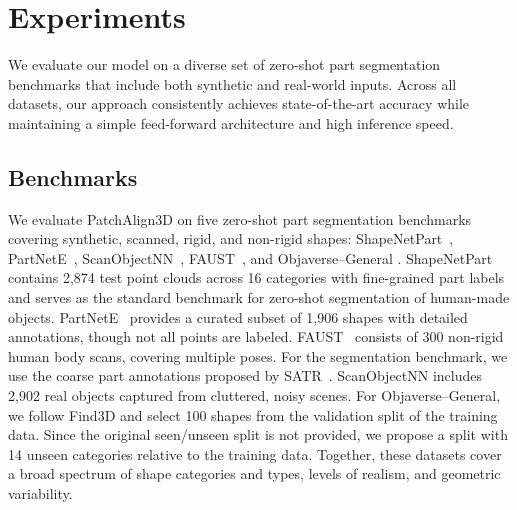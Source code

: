 \section{Experiments}
\label{sec:experiments}

We evaluate our model on a diverse set of zero-shot part segmentation benchmarks that include both synthetic and real-world inputs.  
Across all datasets, our approach consistently achieves state-of-the-art accuracy while maintaining a simple feed-forward architecture and high inference speed.

\subsection{Benchmarks}

We evaluate PatchAlign3D on five zero-shot part segmentation benchmarks covering synthetic, scanned, rigid, and non-rigid shapes: ShapeNetPart~\cite{yi2016scalable}, PartNetE~\cite{liu2023partslip}, ScanObjectNN~\cite{uy2019revisiting}, FAUST~\cite{bogo2014faust}, and Objaverse–General \cite{ma2025find, deitke2023objaverse}. 
ShapeNetPart~\cite{yi2016scalable} contains 2,874 test point clouds across 16 categories with fine-grained part labels and serves as the standard benchmark for zero-shot segmentation of human-made objects. 
PartNetE~\cite{liu2023partslip} provides a curated subset of 1,906 shapes with detailed annotations, though not all points are labeled. 
FAUST~\cite{bogo2014faust} consists of 300 non-rigid human body scans, covering multiple poses. For the segmentation benchmark, we use the coarse part annotations proposed by SATR~\cite{abdelreheem2023satr}.
ScanObjectNN includes 2,902 real objects captured from cluttered, noisy scenes. 
For Objaverse–General, we follow Find3D \cite{ma2025find} and select 100 shapes from the validation split of the training data. Since the original seen/unseen split is not provided, we propose a split with 14 unseen categories relative to the training data. 
Together, these datasets cover a broad spectrum of shape categories and types, levels of realism, and geometric variability.



